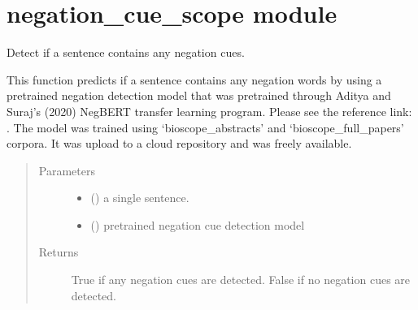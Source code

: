 \documentclass[letterpaper,10pt,english]{sphinxmanual}
\begin{document}
\section{negation\_cue\_scope module}
\label{\detokenize{negation_cue_scope:module-negation_cue_scope}}\label{\detokenize{negation_cue_scope:negation-cue-scope-module}}\label{\detokenize{negation_cue_scope::doc}}

\begin{fulllineitems}
\label{\detokenize{negation_cue_scope:negation_cue_scope.negation_detect}}
\sphinxAtStartPar
Detect if a sentence contains any negation cues.

\sphinxAtStartPar
This function predicts if a sentence contains any negation words by using a pre\sphinxhyphen{}trained negation detection model that was pre\sphinxhyphen{}trained through Aditya and Suraj’s (2020) NegBERT transfer learning program.
Please see the reference link: . The model was trained using ‘bioscope\_abstracts’ and ‘bioscope\_full\_papers’ corpora.
It was upload to a cloud repository and was freely available.
\begin{quote}\begin{description}
\item[{Parameters}] \leavevmode\begin{itemize}
\item {} 
\sphinxAtStartPar
{} () \textendash{} a single sentence.

\item {} 
\sphinxAtStartPar
{} () \textendash{} pre\sphinxhyphen{}trained negation cue detection model

\end{itemize}

\item[{Returns}] \leavevmode
\sphinxAtStartPar
True if any negation cues are detected.
False if no negation cues are detected.


\end{description}
\end{quote}
\end{fulllineitems}
\end{document}
